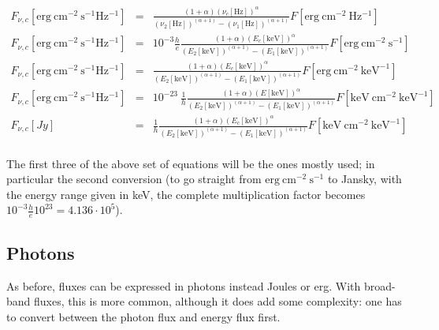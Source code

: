 \documentclass[12pt,a4paper]{article}
\newcommand{\fvc}{\ensuremath{F_{\nu, c}}}
\begin{document}
\begin{eqnarray*}
\fvc[\mathrm{erg}\ \mathrm{cm}^{-2}\ \mathrm{s^{-1}} \mathrm{Hz^{-1}}] & = & \frac{(1+\alpha) {\left(\nu_c\mathrm{[Hz]}\right)}^{\alpha}}{{{\left(\nu_2\mathrm{[Hz]}\right)}}^{(\alpha+1)} - {\left(\nu_1\mathrm{[Hz]}\right)}^{(\alpha+1)}} F[\mathrm{erg}\ \mathrm{cm}^{-2}\ \mathrm{Hz^{-1}}] \\
\fvc[\mathrm{erg}\ \mathrm{cm}^{-2}\ \mathrm{s^{-1}} \mathrm{Hz^{-1}}] & = & 10^{-3} \frac{h}{e} \frac{(1+\alpha) {\left(E_c\mathrm{[keV]}\right)}^{\alpha}}{{\left(E_2\mathrm{[keV]}\right)}^{(\alpha+1)} - {\left(E_1\mathrm{[keV]}\right)}^{(\alpha+1)}} F[\mathrm{erg}\ \mathrm{cm}^{-2}\ \mathrm{s^{-1}}] \\
\fvc[\mathrm{erg}\ \mathrm{cm}^{-2}\ \mathrm{s^{-1}} \mathrm{Hz^{-1}}] & = & \frac{(1+\alpha) {\left(E_c\mathrm{[keV]}\right)}^{\alpha}}{{\left(E_2\mathrm{[keV]}\right)}^{(\alpha+1)} - {\left(E_1\mathrm{[keV]}\right)}^{(\alpha+1)}} F[\mathrm{erg}\ \mathrm{cm}^{-2}\ \mathrm{{keV}^{-1}}] \\
\fvc[\mathrm{erg}\ \mathrm{cm}^{-2}\ \mathrm{s^{-1}} \mathrm{Hz^{-1}}] & = & 10^{-23}\ \frac{1}{h} \frac{(1+\alpha) {\left(E[\mathrm{keV}]\right)}^{\alpha}}{{\left(E_2\mathrm{[keV]}\right)}^{(\alpha+1)} - {\left(E_1\mathrm{[keV]}\right)}^{(\alpha+1)}} F[\mathrm{keV}\ \mathrm{cm}^{-2}\ \mathrm{{keV}^{-1}}] \\
\fvc[Jy] & = & \frac{1}{h} \frac{(1+\alpha) {\left(E_c\mathrm{[keV]}\right)}^{\alpha}}{{\left(E_2\mathrm{[keV]}\right)}^{(\alpha+1)} - {\left(E_1\mathrm{[keV]}\right)}^{(\alpha+1)}} F[\mathrm{keV}\ \mathrm{cm}^{-2}\ \mathrm{{keV}^{-1}}] \\
\end{eqnarray*}

The first three of the above set of equations will be the ones mostly used; in particular the second conversion (to go straight from $\mathrm{erg}\ \mathrm{cm}^{-2}\ \mathrm{s^{-1}}$ to Jansky, with the energy range given in keV, the complete multiplication factor becomes $10^{-3} \frac{h}{e} 10^{23} = 4.136 \cdot 10^{5}$).

\subsection*{Photons}

As before, fluxes can be expressed in photons instead Joules or erg. With broad-band fluxes, this is more common, although it does add some complexity: one has to convert between the photon flux and energy flux first. 
\end{document}
